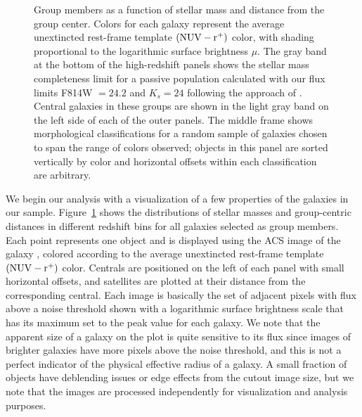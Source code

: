 \documentclass[12pt]{emulateapj}
\newcommand{\nuvr}{{$(\rm{NUV} - r^+)$ }}
\begin{document}
\begin{figure*}[htb]
\caption{Group members as a function of stellar mass and distance from
  the group center. Colors for each galaxy represent the average
  unextincted rest-frame template \nuvr color, with shading
  proportional to the logarithmic surface brightness $\mu$. The gray
  band at the bottom of the high-redshift panels shows the stellar
  mass completeness limit for a passive population calculated with our
  flux limits F814W $ = 24.2$ and $K_s=24$ following the approach of
  \citet{Bundy2010} \citep[see also Figure 1
  of][]{George2011}. Central galaxies in these groups are shown in the
  light gray band on the left side of each of the outer panels. The
  middle frame shows morphological classifications for a random sample
  of galaxies chosen to span the range of colors observed; objects in
  this panel are sorted vertically by color and horizontal offsets
  within each classification are arbitrary.}
\label{fig:candy}
\end{figure*}
 
We begin our analysis with a visualization of a few properties of the
galaxies in our sample. Figure~\ref{fig:candy} shows the distributions
of stellar masses and group-centric distances in different redshift
bins for all galaxies selected as group members. Each point represents
one object and is displayed using the ACS image of the galaxy \citep{Koekemoer2007}, colored
according to the average unextincted rest-frame template \nuvr
color. Centrals are positioned on the left of each panel with small
horizontal offsets, and satellites are plotted at their distance from
the corresponding central. Each image is basically the set of adjacent
pixels with flux above a noise threshold shown with a logarithmic
surface brightness scale that has its maximum set to the peak value
for each galaxy.  We note that the apparent size of a galaxy on the
plot is quite sensitive to its flux since images of brighter galaxies
have more pixels above the noise threshold, and this is not a perfect
indicator of the physical effective radius of a galaxy. A small
fraction of objects have deblending issues or edge effects from the
cutout image size, but we note that the images are processed
independently for visualization and analysis purposes.
 
\end{document}
